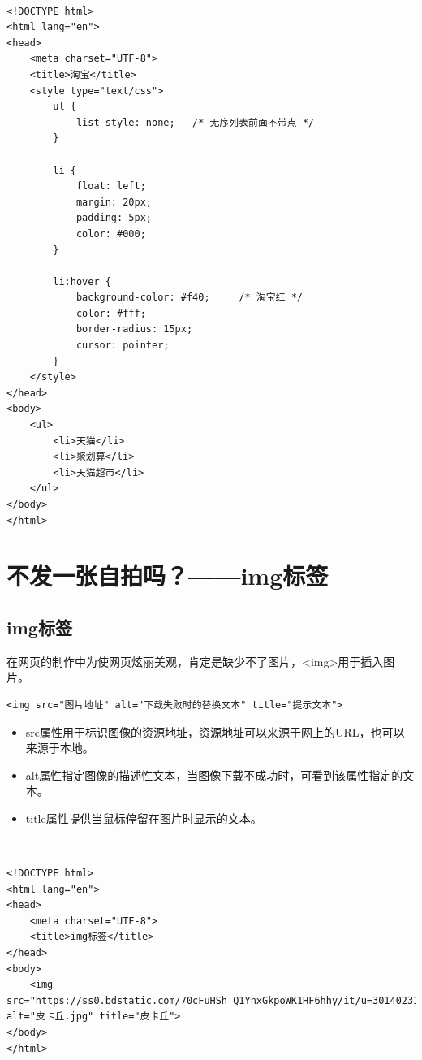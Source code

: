  \\

\begin{lstlisting}[style=htmlcssjs]
<!DOCTYPE html>
<html lang="en">
<head>
    <meta charset="UTF-8">
    <title>淘宝</title>
    <style type="text/css">
        ul {
            list-style: none;   /* 无序列表前面不带点 */
        }

        li {
            float: left;
            margin: 20px;
            padding: 5px;
            color: #000;
        }

        li:hover {
            background-color: #f40;     /* 淘宝红 */
            color: #fff;
            border-radius: 15px;
            cursor: pointer;
        }
    </style>
</head>
<body>
    <ul>
        <li>天猫</li>
        <li>聚划算</li>
        <li>天猫超市</li>
    </ul>
</body>
</html>
\end{lstlisting}

\newpage

\section{不发一张自拍吗？——img标签}

\subsection{img标签}

在网页的制作中为使网页炫丽美观，肯定是缺少不了图片，<img>用于插入图片。 \\

\begin{lstlisting}[style=htmlcssjs]
<img src="图片地址" alt="下载失败时的替换文本" title="提示文本">
\end{lstlisting}

\begin{itemize}
	\item src属性用于标识图像的资源地址，资源地址可以来源于网上的URL，也可以来源于本地。

	\item alt属性指定图像的描述性文本，当图像下载不成功时，可看到该属性指定的文本。

	\item title属性提供当鼠标停留在图片时显示的文本。
\end{itemize}

 \\

\begin{lstlisting}[style=htmlcssjs, breaklines=true, breakatwhitespace=false]
<!DOCTYPE html>
<html lang="en">
<head>
    <meta charset="UTF-8">
    <title>img标签</title>
</head>
<body>
    <img src="https://ss0.bdstatic.com/70cFuHSh_Q1YnxGkpoWK1HF6hhy/it/u=3014023147,616635741&fm=26&gp=0.jpg" alt="皮卡丘.jpg" title="皮卡丘">
</body>
</html>
\end{lstlisting}

